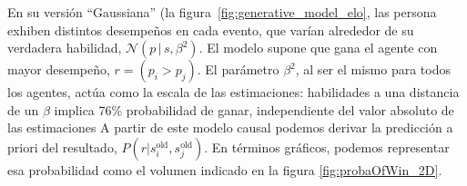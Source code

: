 \documentclass[a4paper,11pt]{book}
\newcommand{\N}{\mathcal{N}}
\theoremstyle{definition}
\begin{document}
%
En su versi\'on ``Gaussiana'' (la figura~\ref{fig:generative_model_elo}, las persona exhiben distintos desempe\~nos en cada evento, que var\'ian alrededor de su verdadera habilidad, $\N(p\,|\,s,\beta^2)$.
%
El modelo supone que gana el agente con mayor desempe\~no, $r = (p_i > p_j)$.
%
El par\'ametro $\beta^2$, al ser el mismo para todos los agentes, act\'ua como la escala de las estimaciones: habilidades a una distancia de un $\beta$ implica 76\% probabilidad de ganar, independiente del valor absoluto de las estimaciones%
%
A partir de este modelo causal podemos derivar la predicci\'on a priori del resultado, $P(r|s_i^{\text{old}},s_j^{\text{old}})$.
%
En t\'erminos gr\'aficos, podemos representar esa probabilidad como el volumen indicado en la figura \ref{fig:probaOfWin_2D}.

\end{document}
